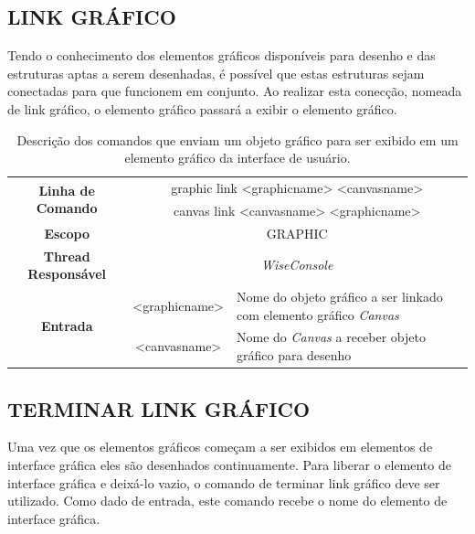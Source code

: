 \subsection{LINK GRÁFICO}\label{sec:graphic_link}

Tendo o conhecimento dos elementos gráficos disponíveis para desenho e das estruturas aptas a serem desenhadas, é possível que estas estruturas sejam conectadas para que funcionem em conjunto. Ao realizar esta conecção, nomeada de link gráfico, o elemento gráfico passará a exibir o elemento gráfico.

\begin{center}
	\begin{table}[!htbp]
		\begin{tabularx}{\textwidth}{c|c|X}
			\toprule
			\multirow{2}{*}{\textbf{Linha de Comando}} & \multicolumn{2}{c}{graphic link <graphic\underline{\space\space}name> <canvas\underline{\space\space}name>} \\
			& \multicolumn{2}{c}{canvas link <canvas\underline{\space\space}name> <graphic\underline{\space\space}name>} \\
			\midrule
			\textbf{Escopo} & \multicolumn{2}{c}{GRAPHIC} \\
			\hline
			\textbf{Thread Responsável} & \multicolumn{2}{c}{\textit{WiseConsole}} \\
			\hline
			\multirow{2}{*}{\textbf{Entrada}} &  <graphic\underline{\space\space}name> & Nome do objeto gráfico a ser linkado com elemento gráfico \textit{Canvas} \\
			& <canvas\underline{\space\space}name> & Nome do \textit{Canvas} a receber objeto gráfico para desenho \\
			\bottomrule
		\end{tabularx}
		\caption{Descrição dos comandos que enviam um objeto gráfico para ser exibido em um elemento gráfico da interface de usuário.}
		\label{tab:graphic_link}
	\end{table}
\end{center}

\subsection{TERMINAR LINK GRÁFICO}\label{sec:graphic_purge}

Uma vez que os elementos gráficos começam a ser exibidos em elementos de interface gráfica eles são desenhados continuamente. Para liberar o elemento de interface gráfica e deixá-lo vazio, o comando de terminar link gráfico deve ser utilizado. Como dado de entrada, este comando recebe o nome do elemento de interface gráfica.

